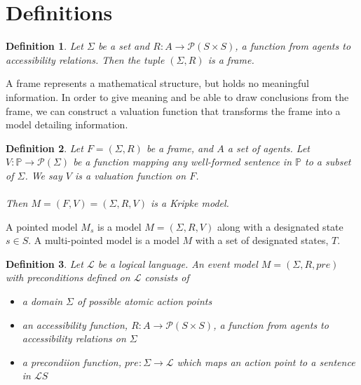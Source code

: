 \documentclass[12pt, a4paper, titlepage]{scrartcl}
\newcommand{\frKripModel}[2] { %
  (#1, #2)
}
\newtheorem{defn}{Definition}
\begin{document}
\section{Definitions}

\begin{defn} \label{frame}
	Let $\Sigma$ be a set and $R: A \to \mathcal{P}(S \times S)$, a function from agents to
	accessibility relations.
	Then the tuple $(\Sigma, R)$ is a frame.
\end{defn}

A frame represents a mathematical structure, but holds no meaningful information.
In order to give meaning and be able to draw conclusions from the frame, we can
construct a valuation function that transforms the frame into a model detailing
information.
\begin{defn} \label{model}
	Let $F = (\Sigma, R)$ be a frame, and $A$ a set of agents.
	Let $V: \mathbb{P} \to \mathcal{P}(\Sigma)$ be a function mapping any
	well-formed	sentence in $\mathbb{P}$ to a subset of $\Sigma$.
	We say $V$ is a valuation function on $F$.\\
	\\
	Then $M = \frKripModel{F}{V} = (\Sigma, R, V)$ is a Kripke
	model.
\end{defn}
A pointed model $M_s$ is a model $M = (\Sigma, R, V)$ along with a designated state $s \in S$.
A multi-pointed model is a model $M$ with a set of designated states, $T$.

\begin{defn} \label{evModel}
	Let $\mathcal{L}$ be a logical language.
	An event model $M = (\Sigma, R, pre)$ with preconditions defined on $\mathcal{L}$ consists of
	\begin{itemize}
		\item a domain $\Sigma$ of possible atomic action points
		\item an accessibility function, $R: A \to \mathcal{P}(S \times S)$, a function from agents to
		accessibility relations on $\Sigma$
		\item a precondiion function, $pre: \Sigma \to \mathcal{L}$ which maps an action point to a
		sentence in $\mathcal{L}S$
	\end{itemize}
\end{defn}
\end{document}
